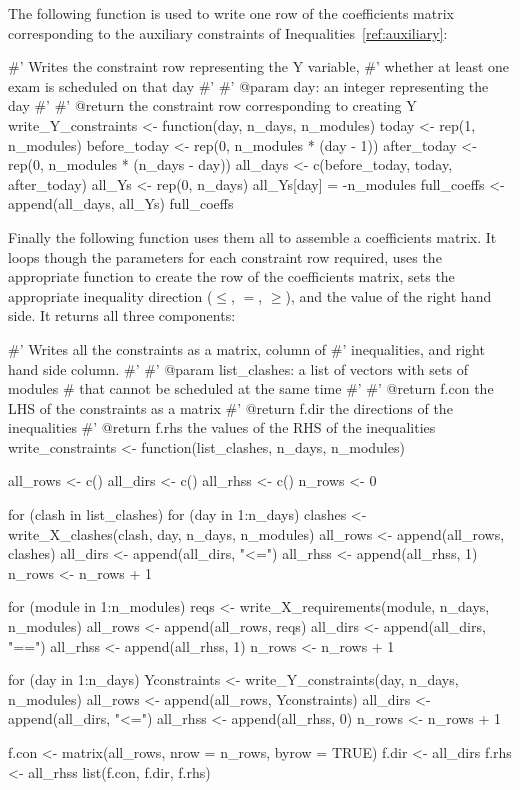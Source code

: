 The following function is used to write one row of the coefficients matrix corresponding to the auxiliary constraints of Inequalities~\ref{ref:auxiliary}:

\begin{Rin}
#' Writes the constraint row representing the Y variable,
#' whether at least one exam is scheduled on that day
#'
#' @param day: an integer representing the day
#'
#' @return the constraint row corresponding to creating Y
write_Y_constraints <- function(day, n_days, n_modules){
  today <- rep(1, n_modules)
  before_today <- rep(0, n_modules * (day - 1))
  after_today <- rep(0, n_modules * (n_days - day))
  all_days <- c(before_today, today, after_today)
  all_Ys <- rep(0, n_days)
  all_Ys[day] = -n_modules
  full_coeffs <- append(all_days, all_Ys)
  full_coeffs
}
\end{Rin}

Finally the following function uses them all to assemble a coefficients matrix.
It loops though the parameters for each constraint row required, uses the appropriate function to create the row of the coefficients matrix, sets the appropriate inequality direction ($\leq$, $=$, $\geq$), and the value of the right hand side.
It returns all three components:

\begin{Rin}
#' Writes all the constraints as a matrix, column of
#' inequalities, and right hand side column.
#'
#' @param list_clashes: a list of vectors with sets of modules
#         that cannot be scheduled at the same time
#'
#' @return f.con the LHS of the constraints as a matrix
#' @return f.dir the directions of the inequalities
#' @return f.rhs the values of the RHS of the inequalities
write_constraints <- function(list_clashes, n_days, n_modules){
  all_rows <- c()
  all_dirs <- c()
  all_rhss <- c()
  n_rows <- 0
  
  for (clash in list_clashes){
    for (day in 1:n_days){
      clashes <- write_X_clashes(clash, day, n_days, n_modules)
      all_rows <- append(all_rows, clashes)
      all_dirs <- append(all_dirs, "<=")
      all_rhss <- append(all_rhss, 1)
      n_rows <- n_rows + 1
    }
  }
  
  for (module in 1:n_modules){
    reqs <- write_X_requirements(module, n_days, n_modules)
    all_rows <- append(all_rows, reqs)
    all_dirs <- append(all_dirs, "==")
    all_rhss <- append(all_rhss, 1)
    n_rows <- n_rows + 1
  }
  
  for (day in 1:n_days){
    Yconstraints <- write_Y_constraints(day, n_days, n_modules)
    all_rows <- append(all_rows, Yconstraints)
    all_dirs <- append(all_dirs, "<=")
    all_rhss <- append(all_rhss, 0)
    n_rows <- n_rows + 1
  }
  
  f.con <- matrix(all_rows, nrow = n_rows, byrow = TRUE)
  f.dir <- all_dirs
  f.rhs <- all_rhss
  list(f.con, f.dir, f.rhs)
}
\end{Rin}

